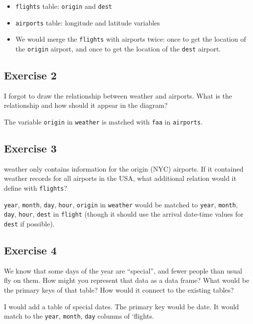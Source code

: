 \documentclass[]{book}
\providecommand{\tightlist}{%
  \setlength{\itemsep}{0pt}\setlength{\parskip}{0pt}}
\theoremstyle{definition}
\theoremstyle{definition}
\theoremstyle{definition}
\theoremstyle{remark}
\begin{document}
\begin{itemize}
\tightlist
\item
  \texttt{flights} table: \texttt{origin} and \texttt{dest}
\item
  \texttt{airports} table: longitude and latitude variables
\item
  We would merge the \texttt{flights} with airports twice: once to get
  the location of the \texttt{origin} airport, and once to get the
  location of the \texttt{dest} airport.
\end{itemize}

\hypertarget{exercise-2-20}{%
\subsection{Exercise 2}\label{exercise-2-20}}

I forgot to draw the relationship between weather and airports. What is
the relationship and how should it appear in the diagram?

The variable \texttt{origin} in \texttt{weather} is matched with
\texttt{faa} in \texttt{airports}.

\hypertarget{exercise-3-17}{%
\subsection{Exercise 3}\label{exercise-3-17}}

weather only contains information for the origin (NYC) airports. If it
contained weather records for all airports in the USA, what additional
relation would it define with \texttt{flights}?

\texttt{year}, \texttt{month}, \texttt{day}, \texttt{hour},
\texttt{origin} in \texttt{weather} would be matched to \texttt{year},
\texttt{month}, \texttt{day}, \texttt{hour}, \texttt{dest} in
\texttt{flight} (though it should use the arrival date-time values for
\texttt{dest} if possible).

\hypertarget{exercise-4-14}{%
\subsection{Exercise 4}\label{exercise-4-14}}

We know that some days of the year are ``special'', and fewer people
than usual fly on them. How might you represent that data as a data
frame? What would be the primary keys of that table? How would it
connect to the existing tables?

I would add a table of special dates. The primary key would be date. It
would match to the \texttt{year}, \texttt{month}, \texttt{day} columns
of `flights.
\end{document}

